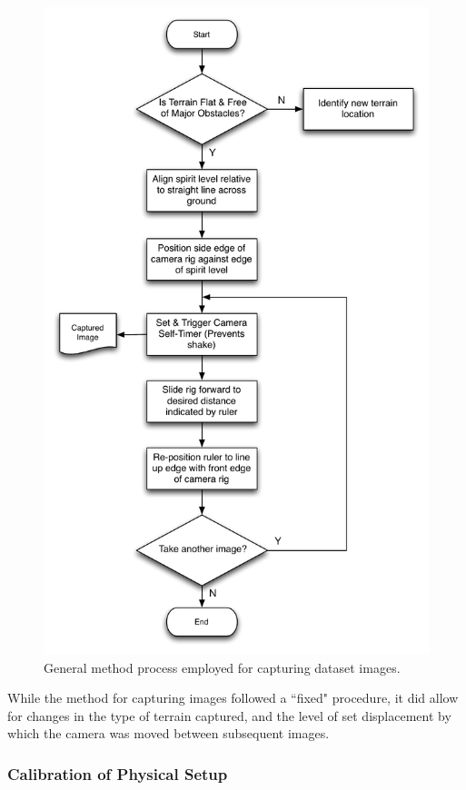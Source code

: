 \begin{figure}[ht!]
\centering
\includegraphics[scale=0.6]{images/camera_flow.pdf}
  \caption{General method process employed for capturing dataset images.}
\label{fig:flow}
\end{figure}

While the method for capturing images followed a ``fixed" procedure, it did allow for changes in the type of terrain captured, and the level of set displacement by which the camera was moved between subsequent images.



\subsubsection{Calibration of Physical Setup}

